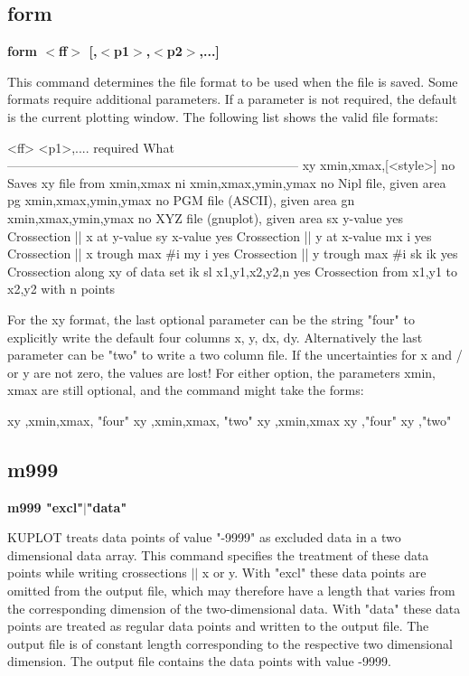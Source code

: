 \subsection*{form}
{\bf form $ <$ff$> $ [,$ <$p1$> $,$ <$p2$> $,...] \par }
\par
\vspace{3pt}
This command determines the file format to be used when the file is 
saved. Some formats require additional parameters. If a parameter 
is not required, the default is the current plotting window. 
The following list shows the valid file formats: 
\par
\begin{MacVerbatim}
<ff>   <p1>,....           required   What
---------------------------------------------------------------------
 xy    xmin,xmax,[<style>]    no      Saves xy file from xmin,xmax
 ni    xmin,xmax,ymin,ymax    no      Nipl file, given area
 pg    xmin,xmax,ymin,ymax    no      PGM file (ASCII), given area
 gn    xmin,xmax,ymin,ymax    no      XYZ file (gnuplot), given area
 sx    y-value               yes      Crossection || x at y-value
 sy    x-value               yes      Crossection || y at x-value
 mx    i                     yes      Crossection || x trough max #i
 my    i                     yes      Crossection || y trough max #i
 sk    ik                    yes      Crossection along xy of data set ik
 sl    x1,y1,x2,y2,n         yes      Crossection from x1,y1 to x2,y2
                                      with n points
\end{MacVerbatim}
For the xy format, the last optional parameter can be the string 
"four" to explicitly write the default four columns x, y, dx, dy. 
Alternatively the last parameter can be "two" to write a two 
column file.  If the uncertainties for x and / or y are not zero, 
the values are lost! 
For either option, the parameters xmin, xmax are still optional, 
and the command might take the forms: 
\begin{MacVerbatim}
 xy    ,xmin,xmax, "four"
 xy    ,xmin,xmax, "two"
 xy    ,xmin,xmax
 xy    ,"four"
 xy    ,"two"
\end{MacVerbatim}
\subsection*{m999}
{\bf m999 "excl"$| $"data" \par }
\par
\vspace{3pt}
KUPLOT treats data points of value "-9999" as excluded data in a 
two dimensional data array. This command specifies the treatment of 
these data points while writing crossections $| $$| $ x or y. 
With "excl" these data points are omitted from the output file, which 
may therefore have a length that varies from the corresponding 
dimension of the two-dimensional data. 
With "data" these data points are treated as regular data points and 
written to the output file. The output file is of constant length 
corresponding to the respective two dimensional dimension. The 
output file contains the data points with value -9999. 
